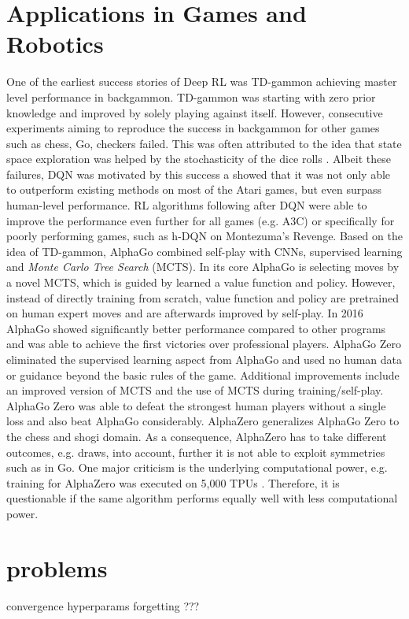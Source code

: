     \section{Applications in Games and Robotics}
    \label{sec:games}
    One of the earliest success stories of Deep RL was TD-gammon \cite{Tesauro1994} achieving master level performance in backgammon.
    TD-gammon was starting with zero prior knowledge and improved by solely playing against itself.
    However, consecutive experiments aiming to reproduce the success in backgammon for other games such as chess, Go, checkers failed.
    This was often attributed to the idea that state space exploration was helped by the stochasticity of the dice rolls \cite{Pollack1997}.
    Albeit these failures, DQN was motivated by this success a showed that it was not only able to outperform existing methods on most of the Atari games, but even surpass human-level performance. 
    RL algorithms following after DQN were able to improve the performance even further for all games (e.g. A3C) or specifically for poorly performing games, such as h-DQN on Montezuma's Revenge.
    Based on the idea of TD-gammon, AlphaGo \cite{Silver2016} combined self-play with CNNs, supervised learning and \textit{Monte Carlo Tree Search} (MCTS). 
    In its core AlphaGo is selecting moves by a novel MCTS, which is guided by learned a value function and policy.
    However, instead of directly training from scratch, value function and policy are pretrained on human expert moves and are afterwards improved by self-play.
    In 2016 AlphaGo showed significantly better performance compared to other programs and was able to achieve the first victories over professional players.
    AlphaGo Zero \cite{Silver2017a} eliminated the supervised learning aspect from AlphaGo and used no human data or guidance beyond the basic rules of the game.
    Additional improvements include an improved version of MCTS and the use of MCTS during training/self-play.
    AlphaGo Zero was able to defeat the strongest human players without a single loss and also beat AlphaGo considerably.
    AlphaZero \cite{Silver2017} generalizes AlphaGo Zero to the chess and shogi domain.
    As a consequence, AlphaZero has to take different outcomes, e.g. draws, into account, further it is not able to exploit symmetries such as in Go.
    One major criticism is the underlying computational power, e.g. training for AlphaZero was executed on 5,000 TPUs \cite{Jouppi2017}. 
    Therefore, it is questionable if the same algorithm performs equally well with less computational power. 
    
    \section{problems}
    convergence 
    hyperparams
    forgetting
    ???

    




